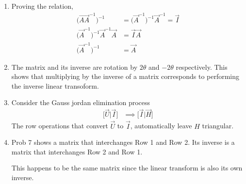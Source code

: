 \begin{enumerate}
    \item Proving the relation,
          \begin{align}
              \big(\vec{AA}^{-1}\big)^{-1} & = \big(\vec{A}^{-1}\big)^{-1}
              \vec{A}^{-1}
              = \vec{I}                                                    \\
              \big(\vec{A}^{-1}\big)^{-1}
              \vec{A}^{-1} \vec{A}         & = \vec{I} \vec{A}             \\
              \big(\vec{A}^{-1}\big)^{-1}  & = \vec{A}
          \end{align}

    \item The matrix and its inverse are rotation by $ 2\theta $ and $ -2\theta $
          respectively. This shows that multiplying by the inverse of a matrix
          corresponds to performing the inverse linear transoform.

    \item Consider the Gauss jordan elimination process
          \begin{align}
              \Big[\vec{U} \big| \vec{I} \Big] &
              \implies \Big[\vec{I} \big| \vec{H} \Big]
          \end{align}
          The row operations that convert $ \vec{U} $ to $ \vec{I} $, automatically leave
          $ H $ triangular.

    \item Prob 7 shows a matrix that interchanges Row 1 and Row 2. Its inverse is a
          matrix that interchanges Row 2 and Row 1. \par
          This happens to be the same matrix since the linear transform is also its own
          inverse.


\end{enumerate}
